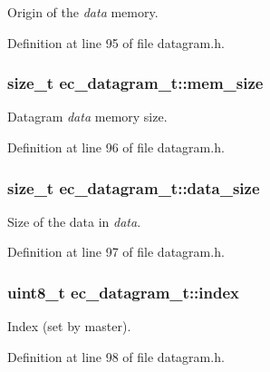 Origin of the {\itshape data} memory. 



Definition at line 95 of file datagram.\-h.

\subsubsection[{mem\-\_\-size}]{\setlength{\rightskip}{0pt plus 5cm}size\-\_\-t ec\-\_\-datagram\-\_\-t\-::mem\-\_\-size}\label{structec__datagram__t_a038f0d3706ceb82a71a87644bb5cb987}


Datagram {\itshape data} memory size. 



Definition at line 96 of file datagram.\-h.

\subsubsection[{data\-\_\-size}]{\setlength{\rightskip}{0pt plus 5cm}size\-\_\-t ec\-\_\-datagram\-\_\-t\-::data\-\_\-size}\label{structec__datagram__t_a2bdc1dfd68576466bfe3d276b9322959}


Size of the data in {\itshape data}. 



Definition at line 97 of file datagram.\-h.

\subsubsection[{index}]{\setlength{\rightskip}{0pt plus 5cm}uint8\-\_\-t ec\-\_\-datagram\-\_\-t\-::index}\label{structec__datagram__t_a76cb4206efa88c4084db0b99c802d5b9}


Index (set by master). 



Definition at line 98 of file datagram.\-h.

